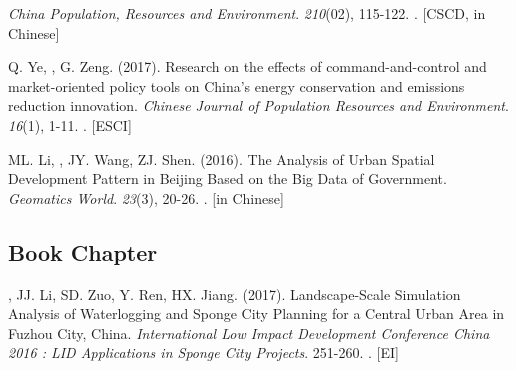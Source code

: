 \begin{etaremune}
    \textit{China Population, Resources and Environment}. \textit{210}(02), 115-122.
    . [CSCD, in Chinese]
\item
    Q. Ye, \Shaoqing, G. Zeng. (2017).
	Research on the effects of command-and-control and market-oriented policy tools on China’s energy conservation and emissions reduction innovation.
    \textit{Chinese Journal of Population Resources and Environment}. \textit{16}(1), 1-11.
    . [ESCI]
\item
    ML. Li, \Shaoqing, JY. Wang, ZJ. Shen. (2016).
	The Analysis of Urban Spatial Development Pattern in Beijing Based on the Big Data of Government.
    \textit{Geomatics World}. \textit{23}(3), 20-26.
    . [in Chinese]
\end{etaremune}

\subsection*{Book Chapter}
\begin{etaremune}
\item
    \Shaoqing, JJ. Li, SD. Zuo, Y. Ren, HX. Jiang. (2017).
	Landscape-Scale Simulation Analysis of Waterlogging and Sponge City Planning for a Central Urban Area in Fuzhou City, China.
    \textit{International Low Impact Development Conference China 2016 : LID Applications in Sponge City Projects}. 251-260.
    . [EI]
\end{etaremune}

